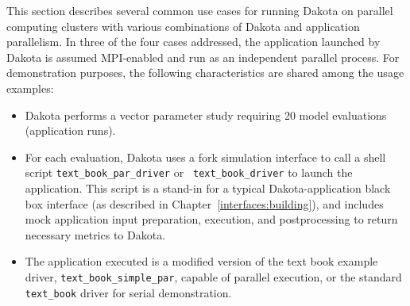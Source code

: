 This section describes several common use cases for running Dakota on
parallel computing clusters with various combinations of Dakota and
application parallelism.  In three of the four cases addressed, the
application launched by Dakota is assumed MPI-enabled and run as an
independent parallel process.  For demonstration purposes, the
following characteristics are shared among the usage examples:
\begin{itemize}
\item Dakota performs a vector parameter study requiring 20 model
evaluations (application runs).

\item For each evaluation, Dakota uses a fork simulation interface to
call a shell script {\tt text\_book\_par\_driver} or {\tt
text\_book\_driver} to launch the application.  This script is a
stand-in for a typical Dakota-application black box interface (as
described in Chapter~\ref{interfaces:building}), and includes mock
application input preparation, execution, and postprocessing to return
necessary metrics to Dakota.

\item The application executed is a modified version of the text book
example driver, {\tt text\_book\_simple\_par}, capable of parallel
execution, or the standard {\tt text\_book} driver for serial
demonstration.
\end{itemize}


